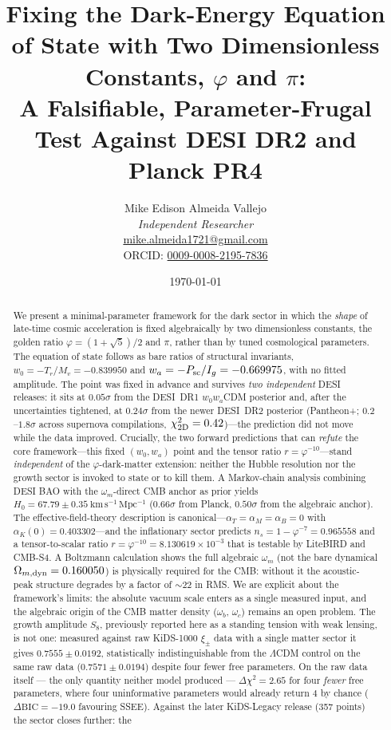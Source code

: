 \documentclass[a4paper,11pt]{article}
\title{\bfseries Fixing the Dark-Energy Equation of State with Two
Dimensionless Constants, $\varphi$ and $\pi$:\\
A Falsifiable, Parameter-Frugal Test Against DESI DR2 and Planck PR4}
\author{Mike Edison Almeida Vallejo \\
\small \textit{Independent Researcher} \\
\small \href{mailto:mike.almeida1721@gmail.com}{mike.almeida1721@gmail.com} \\
\small ORCID: \href{https://orcid.org/0009-0008-2195-7836}{0009-0008-2195-7836}
}
\date{\today}
\newcommand{\kms}{\mathrm{km\,s^{-1}\,Mpc^{-1}}}
\begin{document}
\maketitle

\begin{abstract}
\noindent
We present a minimal-parameter framework for the dark sector in which the
\emph{shape} of late-time cosmic acceleration is fixed algebraically by two
dimensionless constants, the golden ratio $\varphi=(1+\sqrt5)/2$ and $\pi$,
rather than by tuned cosmological parameters. The equation of state follows as
bare ratios of structural invariants, $w_0=-T_r/M_v=-0.839950$ and
$w_a=-P_{\rm sc}/I_g=-0.669975$, with no fitted amplitude. The point was fixed in
advance and survives \emph{two independent} DESI releases: it sits at
$0.05\sigma$ from the DESI~DR1 $w_0w_a$CDM posterior and, after the uncertainties
tightened, at $0.24\sigma$ from the newer DESI~DR2 posterior
(Pantheon+; $0.2$--$1.8\sigma$ across supernova compilations,
$\chi^2_{\rm 2D}=0.42$)---the prediction did not move while the data improved.
Crucially, the two forward predictions that can \emph{refute} the core framework---this
fixed $(w_0,w_a)$ point and the tensor ratio $r=\varphi^{-10}$---stand \emph{independent}
of the $\varphi$-dark-matter extension: neither the Hubble resolution nor the growth
sector is invoked to state or to kill them. A Markov-chain analysis combining DESI BAO with the
$\omega_m$-direct CMB anchor as prior yields $H_0=67.79\pm0.35~\kms$
($0.66\sigma$ from Planck, $0.50\sigma$ from the algebraic anchor). The
effective-field-theory description is canonical---$\alpha_T=\alpha_M=\alpha_B=0$
with $\alpha_K(0)=0.403302$---and the inflationary sector predicts
$n_s=1-\varphi^{-7}=0.965558$ and a tensor-to-scalar ratio $r=\varphi^{-10}=
8.130619\times10^{-3}$ that is testable by LiteBIRD and CMB-S4. A Boltzmann
calculation shows the full algebraic $\omega_m$ (not the bare dynamical
$\Omega_{m,\rm dyn}=0.160050$) is physically required for the CMB:
without it the acoustic-peak structure degrades by a factor of $\sim22$ in RMS.
We are explicit about the framework's limits: the absolute vacuum scale enters
as a single measured input, and the algebraic origin of the CMB matter density
($\omega_b$, $\omega_c$) remains an open problem. The growth amplitude $S_8$,
previously reported here as a standing tension with weak lensing, is not one:
measured against raw KiDS-1000 $\xi_\pm$ data with a single matter sector it
gives $0.7555\pm0.0192$, statistically indistinguishable from the $\Lambda$CDM control on the same raw data ($0.7571\pm0.0194$) despite four fewer free parameters. On the raw data itself --- the only quantity neither model produced --- $\Delta\chi^2=2.65$ for four \emph{fewer} free parameters, where four uninformative parameters would already return $4$ by chance ($\Delta\mathrm{BIC}=-19.0$ favouring SSEE). Against the later KiDS-Legacy release (357 points) the sector closes further: the

\end{abstract}
\end{document}
